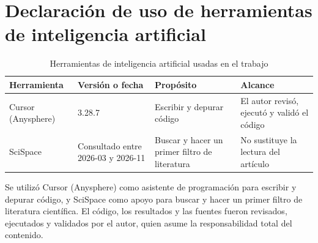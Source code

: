 \chapter*{Declaración de uso de herramientas de inteligencia artificial}

\begin{table}[ht]
\caption{Herramientas de inteligencia artificial usadas en el trabajo}
\label{tab:ia}
\begin{tabular}{p{3.2cm}p{3.4cm}p{3.6cm}p{3.4cm}}
\toprule
Herramienta & Versión o fecha & Propósito & Alcance \\
\midrule
Cursor (Anysphere) & 3.28.7 & Escribir y depurar código & El autor revisó, ejecutó y validó el código \\
SciSpace & Consultado entre 2026-03 y 2026-11 & Buscar y hacer un primer filtro de literatura & No sustituye la lectura del artículo \\
\bottomrule
\end{tabular}
\end{table}

Se utilizó Cursor (Anysphere) como asistente de programación para escribir y depurar código, y SciSpace como apoyo para buscar y hacer un primer filtro de literatura científica. El código, los resultados y las fuentes fueron revisados, ejecutados y validados por el autor, quien asume la responsabilidad total del contenido. \cite{cursor2026,scispace2026}
\clearpage
